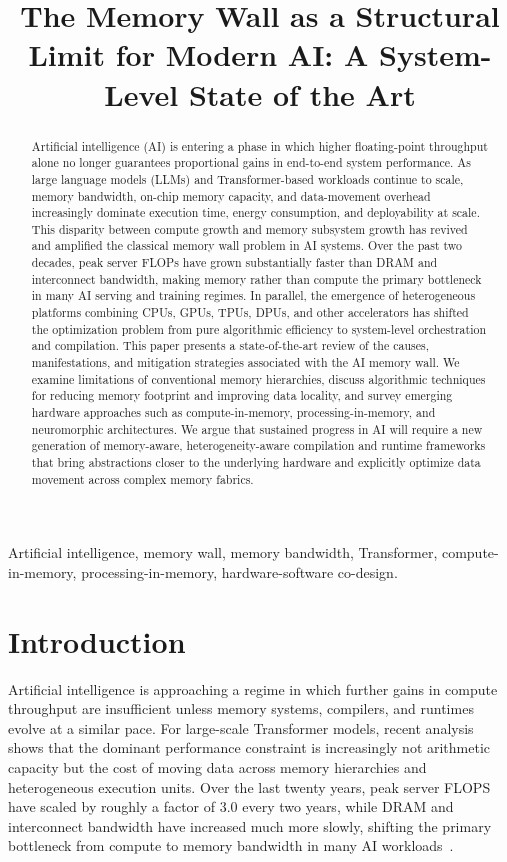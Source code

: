\documentclass[conference]{IEEEtran}
\title{The Memory Wall as a Structural Limit for Modern AI: A System-Level State of the Art}
\author{\IEEEauthorblockN{Dr. Patrick Lemoine}
\IEEEauthorblockA{Independent Researcher / HPC and AI Systems Engineer\\
Email: \texttt{[lemoine\_patrick@yahoo.ca]} \quad ORCID: \texttt{[0009-0008-9465-8159]}}}
\begin{document}
\maketitle

\begin{abstract}
Artificial intelligence (AI) is entering a phase in which higher floating-point throughput alone no longer guarantees proportional gains in end-to-end system performance. As large language models (LLMs) and Transformer-based workloads continue to scale, memory bandwidth, on-chip memory capacity, and data-movement overhead increasingly dominate execution time, energy consumption, and deployability at scale. This disparity between compute growth and memory subsystem growth has revived and amplified the classical memory wall problem in AI systems. Over the past two decades, peak server FLOPs have grown substantially faster than DRAM and interconnect bandwidth, making memory rather than compute the primary bottleneck in many AI serving and training regimes. In parallel, the emergence of heterogeneous platforms combining CPUs, GPUs, TPUs, DPUs, and other accelerators has shifted the optimization problem from pure algorithmic efficiency to system-level orchestration and compilation. This paper presents a state-of-the-art review of the causes, manifestations, and mitigation strategies associated with the AI memory wall. We examine limitations of conventional memory hierarchies, discuss algorithmic techniques for reducing memory footprint and improving data locality, and survey emerging hardware approaches such as compute-in-memory, processing-in-memory, and neuromorphic architectures. We argue that sustained progress in AI will require a new generation of memory-aware, heterogeneity-aware compilation and runtime frameworks that bring abstractions closer to the underlying hardware and explicitly optimize data movement across complex memory fabrics.
\end{abstract}

\begin{IEEEkeywords}
Artificial intelligence, memory wall, memory bandwidth, Transformer, compute-in-memory, processing-in-memory, hardware-software co-design.
\end{IEEEkeywords}

\section{Introduction}

Artificial intelligence is approaching a regime in which further gains in compute throughput are insufficient unless memory systems, compilers, and runtimes evolve at a similar pace. For large-scale Transformer models, recent analysis shows that the dominant performance constraint is increasingly not arithmetic capacity but the cost of moving data across memory hierarchies and heterogeneous execution units. Over the last twenty years, peak server FLOPS have scaled by roughly a factor of 3.0 every two years, while DRAM and interconnect bandwidth have increased much more slowly, shifting the primary bottleneck from compute to memory bandwidth in many AI workloads~\cite{gholami2024ai}.
\end{document}
